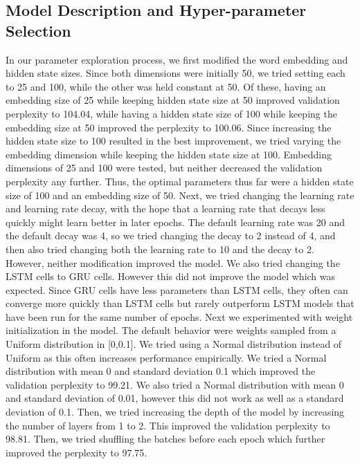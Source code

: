 \documentclass[a4paper]{article}
\begin{document}
\subsection*{Model Description and Hyper-parameter Selection}
In our parameter exploration process, we first modified the word embedding and hidden state sizes. Since both dimensions were initially 50, we tried setting each to 25 and 100, while the other was held constant at 50. Of these, having an embedding size of 25 while keeping hidden state size at 50 improved validation perplexity to 104.04, while having a hidden state size of 100 while keeping the embedding size at 50 improved the perplexity to 100.06. Since increasing the hidden state size to 100 resulted in the best improvement, we tried varying the embedding dimension while keeping the hidden state size at 100. Embedding dimensions of 25 and 100 were tested, but neither decreased the validation perplexity any further. Thus, the optimal parameters thus far were a hidden state size of 100 and an embedding size of 50. 
\newline
\newline
Next, we tried changing the learning rate and learning rate decay, with the hope that a learning rate that decays less quickly might learn better in later epochs. The default learning rate was 20 and the default decay was 4, so we tried changing the decay to 2 instead of 4, and then also tried changing both the learning rate to 10 and the decay to 2. However, neither modification improved the model. We also tried changing the LSTM cells to GRU cells. However this did not improve the model which was expected. Since GRU cells have less parameters than LSTM cells, they often can converge more quickly than LSTM cells but rarely outperform LSTM models that have been run for the same number of epochs.
\newline
\newline
Next we experimented with weight initialization in the model. The default behavior were weights sampled from a Uniform distribution in [0,0.1]. We tried using a Normal distribution instead of Uniform as this often increases performance empirically. We tried a Normal distribution with mean 0 and standard deviation 0.1 which improved the validation perplexity to 99.21. We also tried a Normal distribution with mean 0 and standard deviation of 0.01, however this did not work as well as a standard deviation of 0.1. Then, we tried increasing the depth of the model by increasing the number of layers from 1 to 2. This improved the validation perplexity to 98.81. Then, we tried shuffling the batches before each epoch which further improved the perplexity to 97.75.
\end{document}
